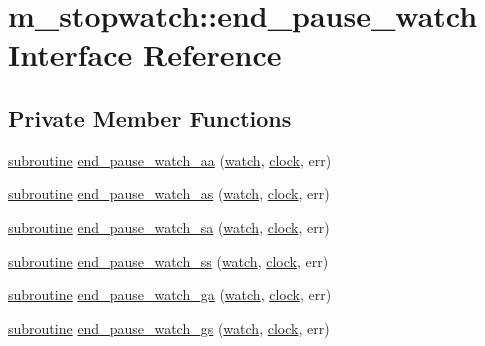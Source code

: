 \hypertarget{interfacem__stopwatch_1_1end__pause__watch}{}\section{m\+\_\+stopwatch\+:\+:end\+\_\+pause\+\_\+watch Interface Reference}
\label{interfacem__stopwatch_1_1end__pause__watch}
\subsection*{Private Member Functions}
\begin{DoxyCompactItemize}
\item 
\hyperlink{M__stopwatch_83_8txt_acfbcff50169d691ff02d4a123ed70482}{subroutine} \hyperlink{interfacem__stopwatch_1_1end__pause__watch_a8a8454ef64a4425ab2ff6545938a2060}{end\+\_\+pause\+\_\+watch\+\_\+aa} (\hyperlink{read__watch_83_8txt_ad2129669fa47b8899641309620add095}{watch}, \hyperlink{stop__watch_83_8txt_a148c035b430d6edf5413dbd2704facfb}{clock}, err)
\item 
\hyperlink{M__stopwatch_83_8txt_acfbcff50169d691ff02d4a123ed70482}{subroutine} \hyperlink{interfacem__stopwatch_1_1end__pause__watch_aa403e6b2b62e3f99b212e07a7a8fedb8}{end\+\_\+pause\+\_\+watch\+\_\+as} (\hyperlink{read__watch_83_8txt_ad2129669fa47b8899641309620add095}{watch}, \hyperlink{stop__watch_83_8txt_a148c035b430d6edf5413dbd2704facfb}{clock}, err)
\item 
\hyperlink{M__stopwatch_83_8txt_acfbcff50169d691ff02d4a123ed70482}{subroutine} \hyperlink{interfacem__stopwatch_1_1end__pause__watch_a087827cb1f4baaf23d694d0742b4a6fe}{end\+\_\+pause\+\_\+watch\+\_\+sa} (\hyperlink{read__watch_83_8txt_ad2129669fa47b8899641309620add095}{watch}, \hyperlink{stop__watch_83_8txt_a148c035b430d6edf5413dbd2704facfb}{clock}, err)
\item 
\hyperlink{M__stopwatch_83_8txt_acfbcff50169d691ff02d4a123ed70482}{subroutine} \hyperlink{interfacem__stopwatch_1_1end__pause__watch_a3556044c409354912380b0a680fb90fb}{end\+\_\+pause\+\_\+watch\+\_\+ss} (\hyperlink{read__watch_83_8txt_ad2129669fa47b8899641309620add095}{watch}, \hyperlink{stop__watch_83_8txt_a148c035b430d6edf5413dbd2704facfb}{clock}, err)
\item 
\hyperlink{M__stopwatch_83_8txt_acfbcff50169d691ff02d4a123ed70482}{subroutine} \hyperlink{interfacem__stopwatch_1_1end__pause__watch_a92e6ba93cc87135a10d395b5ee3dfecf}{end\+\_\+pause\+\_\+watch\+\_\+ga} (\hyperlink{read__watch_83_8txt_ad2129669fa47b8899641309620add095}{watch}, \hyperlink{stop__watch_83_8txt_a148c035b430d6edf5413dbd2704facfb}{clock}, err)
\item 
\hyperlink{M__stopwatch_83_8txt_acfbcff50169d691ff02d4a123ed70482}{subroutine} \hyperlink{interfacem__stopwatch_1_1end__pause__watch_a10521f6715c46bcc1e03e170523a945d}{end\+\_\+pause\+\_\+watch\+\_\+gs} (\hyperlink{read__watch_83_8txt_ad2129669fa47b8899641309620add095}{watch}, \hyperlink{stop__watch_83_8txt_a148c035b430d6edf5413dbd2704facfb}{clock}, err)
\end{DoxyCompactItemize}


